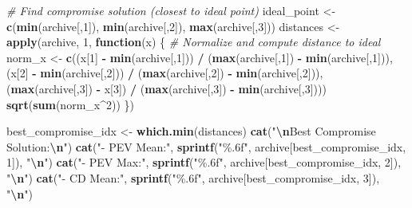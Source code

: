 \documentclass[
]{article}
\newenvironment{Shaded}{\begin{snugshade}}{\end{snugshade}}
\newcommand{\CommentTok}[1]{\textcolor[rgb]{0.56,0.35,0.01}{\textit{#1}}}
\newcommand{\ControlFlowTok}[1]{\textcolor[rgb]{0.13,0.29,0.53}{\textbf{#1}}}
\newcommand{\DecValTok}[1]{\textcolor[rgb]{0.00,0.00,0.81}{#1}}
\newcommand{\FunctionTok}[1]{\textcolor[rgb]{0.13,0.29,0.53}{\textbf{#1}}}
\newcommand{\NormalTok}[1]{#1}
\newcommand{\OtherTok}[1]{\textcolor[rgb]{0.56,0.35,0.01}{#1}}
\newcommand{\SpecialCharTok}[1]{\textcolor[rgb]{0.81,0.36,0.00}{\textbf{#1}}}
\newcommand{\StringTok}[1]{\textcolor[rgb]{0.31,0.60,0.02}{#1}}
\begin{document}
\begin{Shaded}
\begin{Highlighting}[]
\CommentTok{\# Find compromise solution (closest to ideal point)}
\NormalTok{ideal\_point }\OtherTok{\textless{}{-}} \FunctionTok{c}\NormalTok{(}\FunctionTok{min}\NormalTok{(archive[,}\DecValTok{1}\NormalTok{]), }\FunctionTok{min}\NormalTok{(archive[,}\DecValTok{2}\NormalTok{]), }\FunctionTok{max}\NormalTok{(archive[,}\DecValTok{3}\NormalTok{]))}
\NormalTok{distances }\OtherTok{\textless{}{-}} \FunctionTok{apply}\NormalTok{(archive, }\DecValTok{1}\NormalTok{, }\ControlFlowTok{function}\NormalTok{(x) \{}
  \CommentTok{\# Normalize and compute distance to ideal}
\NormalTok{  norm\_x }\OtherTok{\textless{}{-}} \FunctionTok{c}\NormalTok{((x[}\DecValTok{1}\NormalTok{] }\SpecialCharTok{{-}} \FunctionTok{min}\NormalTok{(archive[,}\DecValTok{1}\NormalTok{])) }\SpecialCharTok{/}\NormalTok{ (}\FunctionTok{max}\NormalTok{(archive[,}\DecValTok{1}\NormalTok{]) }\SpecialCharTok{{-}} \FunctionTok{min}\NormalTok{(archive[,}\DecValTok{1}\NormalTok{])),}
\NormalTok{              (x[}\DecValTok{2}\NormalTok{] }\SpecialCharTok{{-}} \FunctionTok{min}\NormalTok{(archive[,}\DecValTok{2}\NormalTok{])) }\SpecialCharTok{/}\NormalTok{ (}\FunctionTok{max}\NormalTok{(archive[,}\DecValTok{2}\NormalTok{]) }\SpecialCharTok{{-}} \FunctionTok{min}\NormalTok{(archive[,}\DecValTok{2}\NormalTok{])),}
\NormalTok{              (}\FunctionTok{max}\NormalTok{(archive[,}\DecValTok{3}\NormalTok{]) }\SpecialCharTok{{-}}\NormalTok{ x[}\DecValTok{3}\NormalTok{]) }\SpecialCharTok{/}\NormalTok{ (}\FunctionTok{max}\NormalTok{(archive[,}\DecValTok{3}\NormalTok{]) }\SpecialCharTok{{-}} \FunctionTok{min}\NormalTok{(archive[,}\DecValTok{3}\NormalTok{])))}
  \FunctionTok{sqrt}\NormalTok{(}\FunctionTok{sum}\NormalTok{(norm\_x}\SpecialCharTok{\^{}}\DecValTok{2}\NormalTok{))}
\NormalTok{\})}

\NormalTok{best\_compromise\_idx }\OtherTok{\textless{}{-}} \FunctionTok{which.min}\NormalTok{(distances)}
\FunctionTok{cat}\NormalTok{(}\StringTok{"}\SpecialCharTok{\textbackslash{}n}\StringTok{Best Compromise Solution:}\SpecialCharTok{\textbackslash{}n}\StringTok{"}\NormalTok{)}
\FunctionTok{cat}\NormalTok{(}\StringTok{"{-} PEV Mean:"}\NormalTok{, }\FunctionTok{sprintf}\NormalTok{(}\StringTok{"\%.6f"}\NormalTok{, archive[best\_compromise\_idx, }\DecValTok{1}\NormalTok{]), }\StringTok{"}\SpecialCharTok{\textbackslash{}n}\StringTok{"}\NormalTok{)}
\FunctionTok{cat}\NormalTok{(}\StringTok{"{-} PEV Max:"}\NormalTok{, }\FunctionTok{sprintf}\NormalTok{(}\StringTok{"\%.6f"}\NormalTok{, archive[best\_compromise\_idx, }\DecValTok{2}\NormalTok{]), }\StringTok{"}\SpecialCharTok{\textbackslash{}n}\StringTok{"}\NormalTok{)}
\FunctionTok{cat}\NormalTok{(}\StringTok{"{-} CD Mean:"}\NormalTok{, }\FunctionTok{sprintf}\NormalTok{(}\StringTok{"\%.6f"}\NormalTok{, archive[best\_compromise\_idx, }\DecValTok{3}\NormalTok{]), }\StringTok{"}\SpecialCharTok{\textbackslash{}n}\StringTok{"}\NormalTok{)}
\end{Highlighting}
\end{Shaded}
\end{document}
